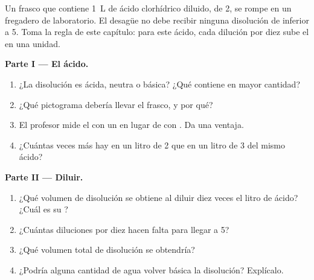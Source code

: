\begin{problem}
\label{pb:g9:acids-bases-ph:1}
Un frasco que contiene \qty{1}{L} de ácido clorhídrico diluido, de
 2, se rompe en un fregadero de laboratorio. El desagüe no debe
recibir ninguna disolución de  inferior a 5. Toma la regla de este
capítulo: para este ácido, cada dilución por diez sube el  en una
unidad.

\medskip
\noindent\textbf{Parte I --- El ácido.}
\begin{enumerate}
  \item ¿La disolución es ácida, neutra o básica? ¿Qué  contiene en
        mayor cantidad?
  \item ¿Qué pictograma debería llevar el frasco, y por qué?
  \item El profesor mide el  con un  en lugar de con . Da una ventaja.
  \item ¿Cuántas veces más   hay en un litro de  2 que en
        un litro de  3 del mismo ácido?
\end{enumerate}

\medskip
\noindent\textbf{Parte II --- Diluir.}
\begin{enumerate}[resume]
  \item ¿Qué volumen de disolución se obtiene al diluir diez veces el
        litro de ácido? ¿Cuál es su ?
  \item ¿Cuántas diluciones por diez hacen falta para llegar a  5?
  \item ¿Qué volumen total de disolución se obtendría?
  \item ¿Podría alguna cantidad de agua volver básica la disolución?
        Explícalo.
\end{enumerate}


\end{problem}
